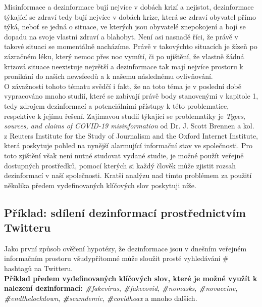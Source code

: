 Misinformace a dezinformace bují nejvíce v dobách krizí a nejistot, dezinformace týkající se zdraví tedy bují nejvíce v dobách krize, která se zdraví obyvatel přímo týká, neboť se jedná o situace, ve kterých jsou obyvatelé znepokojení a bojí se dopadu na svoje vlastní zdraví a blahobyt. Není asi nasnadě říci, že právě v takové situaci se momentálně nacházíme. Právě v takovýchto situacích je žízeň po zázračném léku, který nemoc přes noc vymítí, či po ujištění, že vlastně žádná krizová situace neexistuje největší a dezinformace tak mají nejvíce prostoru k pronikání do našich newsfeedů a k našemu následnému ovlivňování.\\

O závažnosti tohoto tématu svědčí i fakt, že na toto téma je v poslední době vypracováno mnoho studií, které se zabívají právě body stanovenými v kapitole 1, tedy zdrojem dezinformací a potenciálními přístupy k této problematice, respektive k jejímu řešení. Zajímavou studií týkající se problematiky je \textit{Types, sources, and claims of COVID-19 misinformation} od Dr. J. Scott Brennen a kol. z Reuters Institute for the Study of Journalism and the Oxford Internet Institute\cite{noauthor_types_nodate}, která poskytuje pohled na nynější alarmující informační stav ve společnosti. Pro toto zjištění však není nutné studovat vydané studie, je možné použít veřejně dostupných prostředků, pomocí kterých si každý člověk může zjistit rozsah dezinformací v naší společnosti. Kratší analýzu nad tímto problémem za použití několika předem vydefinovaných klíčových slov poskytuji níže.\\

\subsection{Příklad: sdílení dezinformací prostřednictvím Twitteru}

Jako první způsob ověření hypotézy, že dezinformace jsou v dnešním veřejném informačním prostoru všudypřítomné může sloužit prosté vyhledávání \# hashtagů na Twitteru.\\

\textbf{Příklad předem vydefinovaných klíčových slov, které je možné využít k nalezení dezinformací:} \textit{\textbf{\#}fakevirus}, \textit{\textbf{\#}fakecovid}, \textit{\textbf{\#}nomasks}, \textit{\textbf{\#}novaccine}, \textit{\textbf{\#}endthelockdown}, \textit{\textbf{\#}scamdemic}, \textit{\textbf{\#}covidhoax} a mnoho dalších.\\

